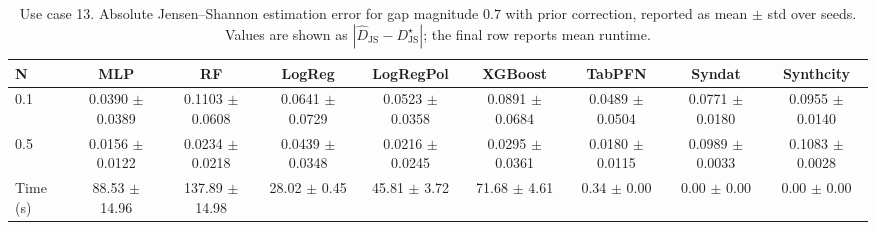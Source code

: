\begin{table}[ht]
\centering
\scriptsize
\setlength{\tabcolsep}{2.5pt}
\caption{Use case 13. Absolute Jensen--Shannon estimation error for gap magnitude $0.7$ with prior correction, reported as mean $\pm$ std over seeds. Values are shown as $|\widehat{D}_{\mathrm{JS}} - D_{\mathrm{JS}}^{\star}|$; the final row reports mean runtime.}
\label{tab:uc13_gap_0p7_on_mean_std_from_seeds}
\begin{tabular}{lcccccccc}
\toprule
N & MLP & RF & LogReg & LogRegPol & XGBoost & TabPFN & Syndat & Synthcity \\
\midrule
0.1 & 0.0390 $\pm$ 0.0389 & 0.1103 $\pm$ 0.0608 & 0.0641 $\pm$ 0.0729 & 0.0523 $\pm$ 0.0358 & 0.0891 $\pm$ 0.0684 & 0.0489 $\pm$ 0.0504 & 0.0771 $\pm$ 0.0180 & 0.0955 $\pm$ 0.0140 \\
0.5 & 0.0156 $\pm$ 0.0122 & 0.0234 $\pm$ 0.0218 & 0.0439 $\pm$ 0.0348 & 0.0216 $\pm$ 0.0245 & 0.0295 $\pm$ 0.0361 & 0.0180 $\pm$ 0.0115 & 0.0989 $\pm$ 0.0033 & 0.1083 $\pm$ 0.0028 \\
Time (s) & 88.53 $\pm$ 14.96 & 137.89 $\pm$ 14.98 & 28.02 $\pm$ 0.45 & 45.81 $\pm$ 3.72 & 71.68 $\pm$ 4.61 & 0.34 $\pm$ 0.00 & 0.00 $\pm$ 0.00 & 0.00 $\pm$ 0.00 \\
\bottomrule
\end{tabular}
\end{table}